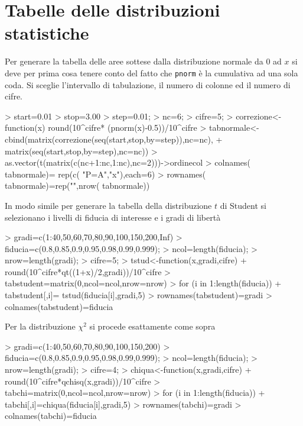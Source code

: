 \documentclass[onecolumn,12pt]{book}
\begin{document}
\section*{Tabelle delle distribuzioni statistiche}
Per generare la tabella delle aree sottese dalla distribuzione normale da 0 ad $x$ si deve per prima cosa tenere conto del fatto che \texttt{pnorm}  \`e la cumulativa ad una sola coda. Si sceglie l'intervallo di tabulazione, il numero di colonne ed il numero di cifre.
\begin{Schunk}
\begin{Sinput}
> start=0.01
> stop=3.00
> step=0.01;
> nc=6;
> cifre=5;
> correzione<-function(x)  round(10^cifre* (pnorm(x)-0.5))/10^cifre
>  tabnormale<-cbind(matrix(correzione(seq(start,stop,by=step)),nc=nc),
+  matrix(seq(start,stop,by=step),nc=nc))
> as.vector(t(matrix(c(nc+1:nc,1:nc),nc=2)))->ordinecol
> colnames( tabnormale)= rep(c( "P=A","x"),each=6)
> rownames( tabnormale)=rep("",nrow( tabnormale))
\end{Sinput}
\end{Schunk}
In modo simile per generare la tabella della distribuzione $t$ di Student si selezionano i livelli di fiducia di interesse e  i gradi di libert\`a
\begin{Schunk}
\begin{Sinput}
> gradi=c(1:40,50,60,70,80,90,100,150,200,Inf)
> fiducia=c(0.8,0.85,0.9,0.95,0.98,0.99,0.999);
> ncol=length(fiducia);
> nrow=length(gradi);
> cifre=5;
> tstud<-function(x,gradi,cifre)
+ round(10^cifre*qt((1+x)/2,gradi))/10^cifre
> tabstudent=matrix(0,ncol=ncol,nrow=nrow)
>  for (i in 1:length(fiducia))
+  tabstudent[,i]= tstud(fiducia[i],gradi,5)
>  rownames(tabstudent)=gradi
> colnames(tabstudent)=fiducia
\end{Sinput}
\end{Schunk}
 Per la distribuzione $\chi^2$ si procede esattamente come sopra

\begin{Schunk}
\begin{Sinput}
> gradi=c(1:40,50,60,70,80,90,100,150,200)
> fiducia=c(0.8,0.85,0.9,0.95,0.98,0.99,0.999);
> ncol=length(fiducia);
> nrow=length(gradi);
> cifre=4;
> chiqua<-function(x,gradi,cifre)
+ round(10^cifre*qchisq(x,gradi))/10^cifre
> tabchi=matrix(0,ncol=ncol,nrow=nrow)
> for (i in 1:length(fiducia))
+ tabchi[,i]=chiqua(fiducia[i],gradi,5)
> rownames(tabchi)=gradi
> colnames(tabchi)=fiducia
\end{Sinput}
\end{Schunk}
\end{document}
